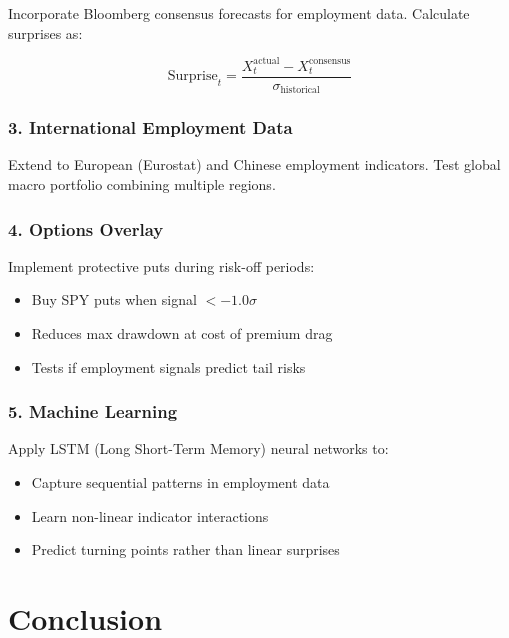 \documentclass[12pt,a4paper]{article}
\begin{document}
Incorporate Bloomberg consensus forecasts for employment data. Calculate surprises as:

\begin{equation}
\text{Surprise}_t = \frac{X_{t}^{\text{actual}} - X_{t}^{\text{consensus}}}{\sigma_{\text{historical}}}
\end{equation}

\subsubsection{3. International Employment Data}

Extend to European (Eurostat) and Chinese employment indicators. Test global macro portfolio combining multiple regions.

\subsubsection{4. Options Overlay}

Implement protective puts during risk-off periods:
\begin{itemize}
    \item Buy SPY puts when signal $< -1.0\sigma$
    \item Reduces max drawdown at cost of premium drag
    \item Tests if employment signals predict tail risks
\end{itemize}

\subsubsection{5. Machine Learning}

Apply LSTM (Long Short-Term Memory) neural networks to:
\begin{itemize}
    \item Capture sequential patterns in employment data
    \item Learn non-linear indicator interactions
    \item Predict turning points rather than linear surprises
\end{itemize}

\newpage
\section{Conclusion}
\end{document}
